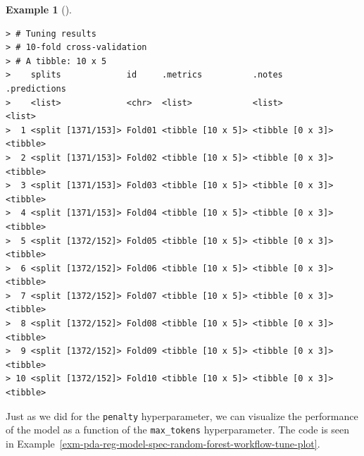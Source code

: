 \documentclass[
  letterpaper,
  DIV=11,
  numbers=noendperiod]{scrreprt}
\theoremstyle{definition}
\newtheorem{example}{Example}[chapter]
\theoremstyle{remark}
\begin{document}
\begin{example}[]
\begin{verbatim}
> # Tuning results
> # 10-fold cross-validation 
> # A tibble: 10 x 5
>    splits             id     .metrics          .notes           .predictions
>    <list>             <chr>  <list>            <list>           <list>      
>  1 <split [1371/153]> Fold01 <tibble [10 x 5]> <tibble [0 x 3]> <tibble>    
>  2 <split [1371/153]> Fold02 <tibble [10 x 5]> <tibble [0 x 3]> <tibble>    
>  3 <split [1371/153]> Fold03 <tibble [10 x 5]> <tibble [0 x 3]> <tibble>    
>  4 <split [1371/153]> Fold04 <tibble [10 x 5]> <tibble [0 x 3]> <tibble>    
>  5 <split [1372/152]> Fold05 <tibble [10 x 5]> <tibble [0 x 3]> <tibble>    
>  6 <split [1372/152]> Fold06 <tibble [10 x 5]> <tibble [0 x 3]> <tibble>    
>  7 <split [1372/152]> Fold07 <tibble [10 x 5]> <tibble [0 x 3]> <tibble>    
>  8 <split [1372/152]> Fold08 <tibble [10 x 5]> <tibble [0 x 3]> <tibble>    
>  9 <split [1372/152]> Fold09 <tibble [10 x 5]> <tibble [0 x 3]> <tibble>    
> 10 <split [1372/152]> Fold10 <tibble [10 x 5]> <tibble [0 x 3]> <tibble>
\end{verbatim}

\end{example}

Just as we did for the \texttt{penalty} hyperparameter, we can visualize
the performance of the model as a function of the \texttt{max\_tokens}
hyperparameter. The code is seen in
Example~\ref{exm-pda-reg-model-spec-random-forest-workflow-tune-plot}.
\end{document}
